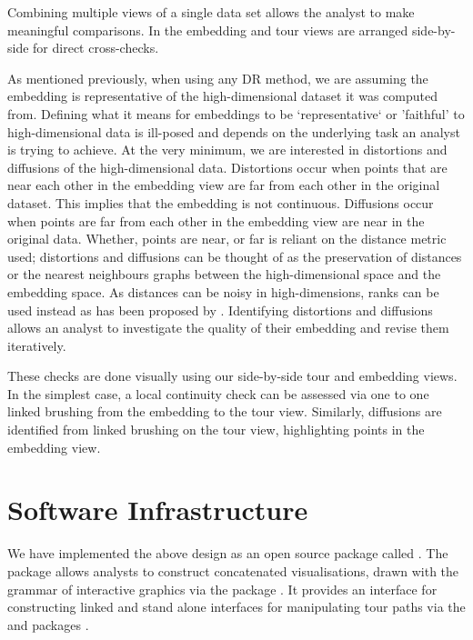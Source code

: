 \documentclass[article,notitle]{jdssv}
\begin{document}
Combining multiple views of a single data set allows the analyst
to make meaningful comparisons. In  the embedding
and tour views are arranged side-by-side for direct cross-checks.

As mentioned previously, when using any DR method, we are assuming the
embedding is representative of the high-dimensional dataset it was computed
from. Defining what it means for embeddings to be `representative` or 'faithful'
to high-dimensional data is ill-posed and depends on the underlying task an
analyst is trying to achieve. At the very minimum, we are interested in
distortions and diffusions of the high-dimensional data. Distortions occur when
points that are near each other in the embedding view are far from each other
in the original dataset. This implies that the embedding is not continuous.
Diffusions occur when points are far from each other in the embedding view are
near in the original data. Whether, points are near, or far is reliant on the
distance metric used; distortions and diffusions can be thought of as the
preservation of distances or the nearest neighbours graphs between the
high-dimensional space and the embedding space. As distances can be noisy in
high-dimensions, ranks can be used instead as has been proposed by \citet{Lee2009-zb}.
Identifying distortions and diffusions allows an analyst to investigate the
quality of their embedding and revise them iteratively.

These checks are done visually using our side-by-side tour and embedding views.
In the simplest case, a local continuity check can be assessed via one to
one linked brushing from the embedding to the tour view. Similarly, diffusions
are identified from linked brushing on the tour view, highlighting points
in the embedding view.

\hypertarget{software-infrastructure}{%
\section{Software Infrastructure}\label{software-infrastructure}}

We have implemented the above design as an open source  package called
 \citep{r-liminal}. The package allows analysts to construct concatenated
visualisations, drawn with the  grammar of interactive graphics via
the  package \citep{Satyanarayan2017-gs, Lyttle2020-hp}. It provides
an interface for constructing linked and stand alone interfaces for
manipulating tour paths via the  and  packages
\citep{Chang2020-bq, Wickham2011-st}.
\end{document}
